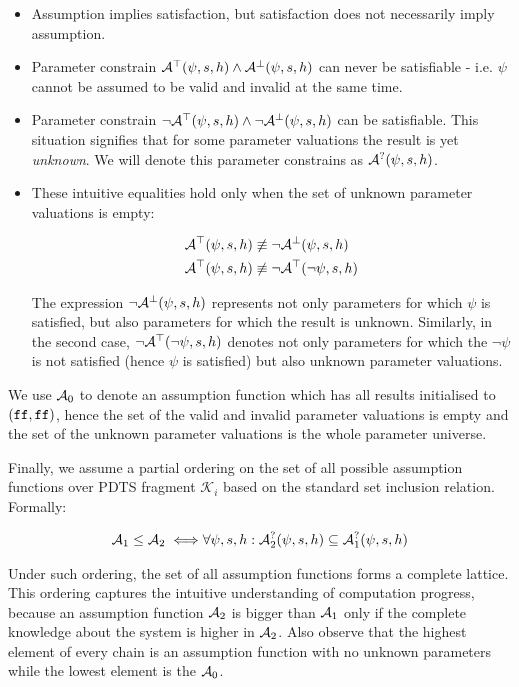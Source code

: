 \begin{itemize}
	\item Assumption implies satisfaction, but satisfaction does not necessarily imply assumption.
	\item Parameter constrain $\mathcal{A}^\top(\psi, s, h) \land \mathcal{A}^\bot(\psi, s, h)$ can never be satisfiable - i.e. $\psi$ cannot be assumed to be valid and invalid at the same time.
	\item Parameter constrain $\neg\mathcal{A}^\top(\psi, s, h) \land \neg\mathcal{A}^\bot(\psi, s, h)$ can be satisfiable. This situation signifies that for some parameter valuations the result is yet \emph{unknown}. We will denote this parameter constrains as $\mathcal{A}^?(\psi, s, h)$.
	\item These intuitive equalities hold only when the set of unknown parameter valuations is empty:
	
	\begin{align*}
		\mathcal{A}^\top(\psi, s, h) & \not\equiv \neg \mathcal{A}^\bot(\psi, s, h) \\
		\mathcal{A}^\top(\psi, s, h) & \not\equiv \neg \mathcal{A}^\top(\neg \psi, s, h)
	\end{align*}
	
	The expression $\neg \mathcal{A}^\bot(\psi, s, h)$ represents not only parameters for which $\psi$ is satisfied, but also parameters for which the result is unknown. Similarly, in the second case, $\neg \mathcal{A}^\top(\neg \psi, s, h)$ denotes not only parameters for which the $\neg \psi$ is not satisfied (hence $\psi$ is satisfied) but also unknown parameter valuations.
	
\end{itemize}

We use $\mathcal{A}_0$ to denote an assumption function which has all results initialised to $(\texttt{ff}, \texttt{ff})$, hence the set of the valid and invalid parameter valuations is empty and the set of the unknown parameter valuations is the whole parameter universe.

Finally, we assume a partial ordering on the set of all possible assumption functions over \ac{PDTS} fragment $\mathcal{K}_i$ based on the standard set inclusion relation. Formally:

\begin{align*}
	\mathcal{A}_1 \leq \mathcal{A}_2 \iff & \forall \psi, s, h : \mathcal{A}^?_2(\psi, s, h) \subseteq \mathcal{A}^?_1(\psi, s, h) \\
\end{align*}

Under such ordering, the set of all assumption functions forms a complete lattice. This ordering captures the intuitive understanding of computation progress, because an assumption function $\mathcal{A}_2$ is bigger than $\mathcal{A}_1$ only if the complete knowledge about the system is higher in $\mathcal{A}_2$. Also observe that the highest element of every chain is an assumption function with no unknown parameters while the lowest element is the $\mathcal{A}_0$. 

